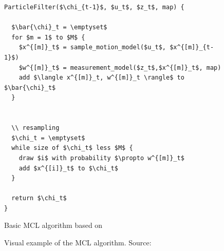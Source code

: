 \begin{figure}
\begin{lstlisting}[mathescape]
ParticleFilter($\chi_{t-1}$, $u_t$, $z_t$, map) {

  $\bar{\chi}_t = \emptyset$
  for $m = 1$ to $M$ {
    $x^{[m]}_t$ = sample_motion_model($u_t$, $x^{[m]}_{t-1}$)
    $w^{[m]}_t$ = measurement_model($z_t$,$x^{[m]}_t$, map)
    add $\langle x^{[m]}_t, w^{[m]}_t \rangle$ to $\bar{\chi}_t$
  }
  
  
  \\ resampling
  $\chi_t = \emptyset$
  while size of $\chi_t$ less $M$ {
    draw $i$ with probability $\propto w^{[m]}_t$
    add $x^{[i]}_t$ to $\chi_t$
  }
  
  return $\chi_t$
}
\end{lstlisting}
\caption{Basic \acl{MCL} algorithm based on \citet{thrun:prob_robo}}
\label{lst:mcl}
\end{figure}



\begin{figure}[width=0.9\textwidth, height=0.4\textheight]
\caption{Visual example of the \acl{MCL} algorithm. Source:~\citep{thrun:prob_robo}}
\label{fig:mcl}
\end{figure}


